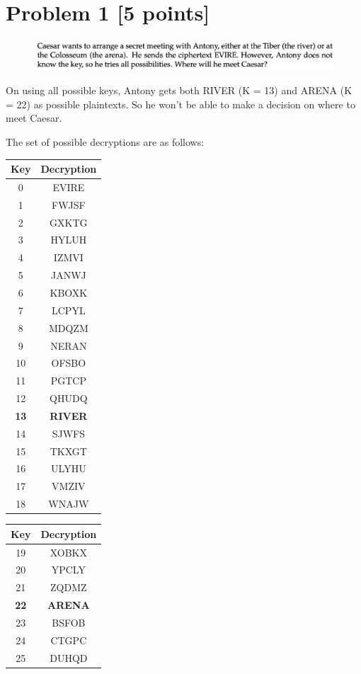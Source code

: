 \documentclass{ashoka-crypto}
\author{Aryan Nath} %
\begin{document}
\section*{Problem 1 [5 points]}

\begin{figure}[h]
\includegraphics[width=17cm]{1}
\end{figure}

On using all possible keys, Antony gets both RIVER (K = 13) and ARENA (K = 22) as possible plaintexts. So he won't be able to make a decision on where to meet Caesar.

The set of possible decryptions are as follows:

\begin{table}[ht]
\centering
\begin{tabular}{|c|c|}
\hline
\textbf{Key} & \textbf{Decryption} \\ \hline
0  & EVIRE  \\ \hline
1  & FWJSF  \\ \hline
2  & GXKTG  \\ \hline
3  & HYLUH  \\ \hline
4  & IZMVI  \\ \hline
5  & JANWJ  \\ \hline
6  & KBOXK  \\ \hline
7  & LCPYL  \\ \hline
8  & MDQZM  \\ \hline
9  & NERAN  \\ \hline
10 & OFSBO  \\ \hline
11 & PGTCP  \\ \hline
12 & QHUDQ  \\ \hline
\textbf{13} & \textbf{RIVER}  \\ \hline
14 & SJWFS  \\ \hline
15 & TKXGT  \\ \hline
16 & ULYHU  \\ \hline
17 & VMZIV  \\ \hline
18 & WNAJW  \\ \hline
\end{tabular}
\end{table}

\begin{table}[ht]
\centering
\begin{tabular}{|c|c|}
\hline
\textbf{Key} & \textbf{Decryption} \\ \hline
19 & XOBKX  \\ \hline
20 & YPCLY  \\ \hline
21 & ZQDMZ  \\ \hline
\textbf{22} & \textbf{ARENA}  \\ \hline
23 & BSFOB  \\ \hline
24 & CTGPC  \\ \hline
25 & DUHQD  \\ \hline
\end{tabular}
\end{table}
\end{document}
